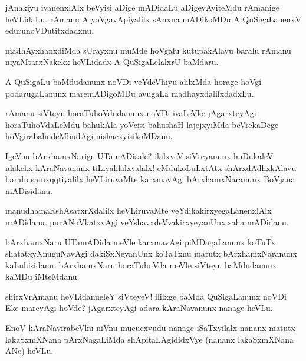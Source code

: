 \begin{mng}
jAnakiyu ivanenxlAlx beVyisi aDige mADidaLu aDigeyAyiteMdu rAmanige heVLidaLu. rAmanu A yoVgavApiyalilx sAnxna mADikoMDu A QuSigaLanenxV edurunoVDutitxdadxnu.
\end{mng}

\begin{mng}
madhAyxhanxdiMda sUrayxnu muMde hoVgalu kutupakAlavu baralu rAmanu niyaMtarxNakekx heVLidadx A QuSigaLelalxrU baMdaru.
\end{mng}

\begin{mng}
A QuSigaLu baMdudanunx noVDi veYdeVhiyu alilxMda horage hoVgi podarugaLanunx maremADigoMDu avugaLa madhayxdalilxdadxLu.
\end{mng}

\begin{mng}
rAmanu siVteyu horaTuhoVdudanunx noVDi ivaLeVke jAgarxteyAgi horaTuhoVdaLeMdu bahukAla yoVcisi bahushaH lajejxyiMda beVrekaDege hoVgirabahudeMbudAgi nishacxyisikoMDanu.
\end{mng}

\begin{mng}
IgeVnu bArxhamxNarige UTamADisale? ilalxveV siVteyanunx huDukaleV idakekx kAraNavanunx tiLiyalilalxvalalx! eMdukoLuLxtAtx shArxdAdhxkAlavu baralu samxqqtiyalilx heVLiruvaMte karxmavAgi bArxhamxNaranunx BoVjana mADisidanu.
\end{mng}

\begin{mng}
manudhamaRshAsatxrXdalilx heVLiruvaMte veYdikakirxyegaLanenxlAlx mADidanu. purANoVkatxvAgi veYshavxdeVvakirxyeyanUnx saha mADidanu.
\end{mng}

\begin{mng}
bArxhamxNaru UTamADida meVle karxmavAgi piMDagaLanunx koTuTx shatatxyXnuguNavAgi dakiSxNeyanUnx koTaTxnu matutx bArxhamxNaranunx kaLuhisidanu. bArxhamxNaru horaTuhoVda meVle siVteyu baMdudanunx kaMDu iMteMdanu.
\end{mng}

\begin{mng}
shirxVrAmanu heVLidanu\mdash eleY siVteyeV! ililxge baMda QuSigaLanunx noVDi Eke mareyAgi hoVde? jAgarxteyAgi adara kAraNavanunx nanage heVLu.
\end{mng}

\begin{mng}
EnoV kAraNavirabeVku niVnu mucucxvudu nanage iSaTxvilalx nananx matutx lakaSxmXNana pArxNagaLiMda shApitaLAgididxVye (nananx lakaSxmXNana ANe) heVLu.
\end{mng}

